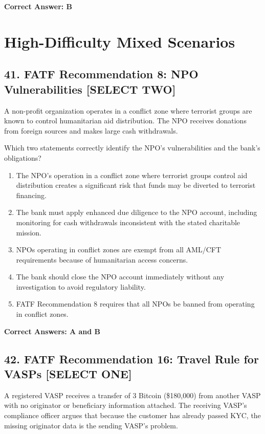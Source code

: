 \documentclass[11pt,a4paper]{article}
\begin{document}
	\textbf{Correct Answer: B}
	
	\section{High-Difficulty Mixed Scenarios}
	
	\subsection{41. FATF Recommendation 8: NPO Vulnerabilities \textnormal{[SELECT TWO]}}
	
	A non-profit organization operates in a conflict zone where terrorist groups are known to control humanitarian aid distribution. The NPO receives donations from foreign sources and makes large cash withdrawals.
	
	Which two statements correctly identify the NPO's vulnerabilities and the bank's obligations?
	
	\begin{enumerate}[label=\Alph*.]
		\item The NPO's operation in a conflict zone where terrorist groups control aid distribution creates a significant risk that funds may be diverted to terrorist financing.
		\item The bank must apply enhanced due diligence to the NPO account, including monitoring for cash withdrawals inconsistent with the stated charitable mission.
		\item NPOs operating in conflict zones are exempt from all AML/CFT requirements because of humanitarian access concerns.
		\item The bank should close the NPO account immediately without any investigation to avoid regulatory liability.
		\item FATF Recommendation 8 requires that all NPOs be banned from operating in conflict zones.
	\end{enumerate}
	
	\textbf{Correct Answers: A and B}
	
	\subsection{42. FATF Recommendation 16: Travel Rule for VASPs \textnormal{[SELECT ONE]}}
	
	A registered VASP receives a transfer of 3 Bitcoin (\$180,000) from another VASP with no originator or beneficiary information attached. The receiving VASP's compliance officer argues that because the customer has already passed KYC, the missing originator data is the sending VASP's problem.
	
\end{document}
